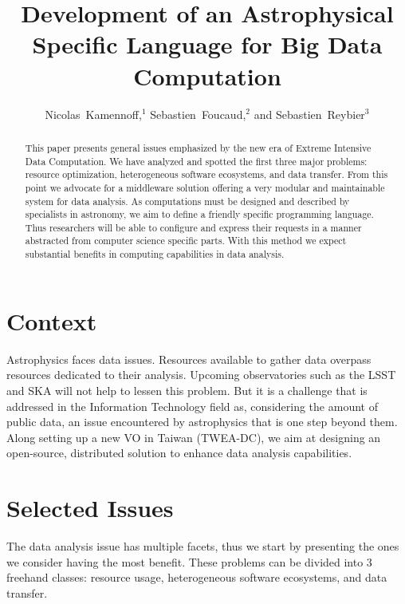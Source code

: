 

\resetcounters


	\title{Development of an Astrophysical Specific Language for Big Data Computation}
	\author{Nicolas~Kamennoff,$^1$ Sebastien~Foucaud,$^2$ and Sebastien~Reybier$^3$}


	\begin{abstract}
		This paper presents general issues emphasized by the new era of Extreme Intensive Data Computation.
		We have analyzed and spotted the first three major problems: resource optimization, heterogeneous software ecosystems, and data transfer.
		From this point we advocate for a middleware solution offering a very modular and maintainable system for data analysis.
		As computations must be designed and described by specialists in astronomy, we aim to define a friendly specific programming language.
		Thus researchers will be able to configure and express their requests in a manner abstracted from computer science specific parts.
		With this method we expect substantial benefits in computing capabilities in data analysis.
	\end{abstract}

	\section{Context}
		Astrophysics faces data issues.
		Resources available to gather data overpass resources dedicated to their analysis.
		Upcoming observatories such as the LSST and SKA will not help to lessen this problem.
		But it is a challenge that is addressed in the Information Technology field as, considering the amount of public data, an issue encountered by astrophysics that is one step beyond them.
		Along setting up a new VO in Taiwan (TWEA-DC), we aim at designing an open-source, distributed solution to enhance data analysis capabilities.

	\section{Selected Issues}
		\label{BLINK_ISSUES}
		The data analysis issue has multiple facets, thus we start by presenting the ones we consider having the most benefit.
		These problems can be divided into 3 freehand classes: resource usage, heterogeneous software ecosystems, and data transfer.
		

